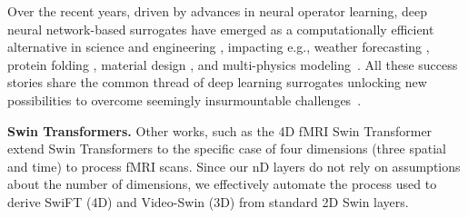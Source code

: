 Over the recent years, driven by advances in neural operator learning, deep neural network-based surrogates have emerged as a computationally efficient alternative in science and engineering \citep{thuerey_physics_2021,zhang_artificial_2023,brunton_machine_2020}, impacting e.g., weather forecasting \citep{thorsten_fourcastnet_2023,bi_accurate_2023,lam_learning_2023,nguyen_climax_2023,bodnar_aurora_2024}, protein folding \citep{jumper_highly_2021,abramson_accurate_2024}, material
design \citep{merchant_scaling_2023,zeni_generative_2025,yang_mattersim_2024}, and multi-physics modeling~\cite{alkin2024neuraldem}. All these success stories share the common thread of deep learning surrogates unlocking new possibilities to overcome seemingly insurmountable challenges~\citep{brandstetter2024envisioning}.

\textbf{Swin Transformers.}
Other works, such as the 4D fMRI Swin Transformer \citep[SwiFT]{kim2023swift} extend Swin Transformers to the specific case of four dimensions (three spatial and time) to process fMRI scans. 
Since our nD layers do not rely on assumptions about the number of dimensions, we effectively automate the process used to derive SwiFT (4D) and Video-Swin \citep{liu_video_2022} (3D) from standard 2D Swin layers.
